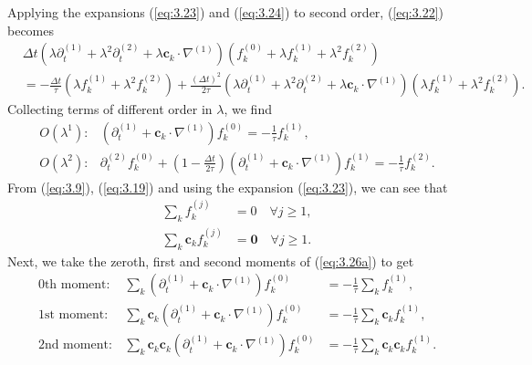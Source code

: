 \documentclass[a4paper, 11pt]{report}
\begin{document}
Applying the expansions (\ref{eq:3.23}) and (\ref{eq:3.24}) to second order, (\ref{eq:3.22}) becomes
\begin{align}
    &\Delta t \left( \lambda \partial_t^{(1)} + \lambda ^2 \partial_t^{(2)} + \lambda \mathbf{c}_k \cdot \nabla^{(1)}\right)\left( f_k^{(0)} + \lambda f_k^{(1)} + \lambda^2 f_k^{(2)}\right) \nonumber \\
    &= -\frac{\Delta t}{\tau}\left(\lambda f_k^{(1)} + \lambda^2 f_k^{(2)}\right) + \frac{(\Delta t)^2}{2\tau}\left( \lambda \partial_t^{(1)} + \lambda ^2 \partial_t^{(2)} + \lambda \mathbf{c}_k \cdot \nabla^{(1)}\right)\left(\lambda f_k^{(1)} + \lambda^2 f_k^{(2)}\right). \label{eq:3.25}
\end{align}
Collecting terms of different order in $\lambda$, we find
\begin{subequations}
\begin{align}
&O(\lambda^1): &\left(\partial_t^{(1)} + \mathbf{c}_k\cdot\nabla^{(1)}\right)f_k^{(0)} = -\frac{1}{\tau}f_k^{(1)},& \label{eq:3.26a}\\
&O(\lambda^2): &\partial_t^{(2)}f_k^{(0)} + \left(1-\frac{\Delta t}{2\tau}\right)\left(\partial_t^{(1)} + \mathbf{c}_k\cdot\nabla^{(1)}\right)f_k^{(1)} = -\frac{1}{\tau}f_k^{(2)}. \label{eq:3.26b}&
\end{align}
\end{subequations}\label{eq:3.26}
From (\ref{eq:3.9}), (\ref{eq:3.19}) and using the expansion (\ref{eq:3.23}), we can see that
\begin{subequations} \label{eq:3.27}
\begin{align}
    \sum_k f_k^{(j)} &= 0 \quad \forall j \geq 1, \label{eq:3.27a}\\
    \sum_k \mathbf{c}_k f_k^{(j)} &= \mathbf{0} \quad \forall j \geq 1. \label{eq:3.27b}
\end{align}
\end{subequations}
Next, we take the zeroth, first and second moments of (\ref{eq:3.26a}) to get
\begin{subequations}
\begin{align}
&0\text{th moment}: & \sum_k\left(\partial_t^{(1)} + \mathbf{c}_k\cdot\nabla^{(1)}\right)f_k^{(0)} &= {-\frac{1}{\tau}\sum_kf_k^{(1)}},& \label{eq:3.28a}\\
&1\text{st moment}: &\sum_k\mathbf{c}_k\left(\partial_t^{(1)} + \mathbf{c}_k\cdot\nabla^{(1)}\right)f_k^{(0)} &= {-\frac{1}{\tau}\sum_k\mathbf{c}_kf_k^{(1)}},& \label{eq:3.28b}\\
&2\text{nd moment}: &\sum_k\mathbf{c}_k\mathbf{c}_k\left(\partial_t^{(1)} + \mathbf{c}_k\cdot\nabla^{(1)}\right)f_k^{(0)} &= -\frac{1}{\tau}\sum_k\mathbf{c}_k\mathbf{c}_kf_k^{(1)}.& \label{eq:3.28c}
\end{align}
\end{subequations}
\end{document}
